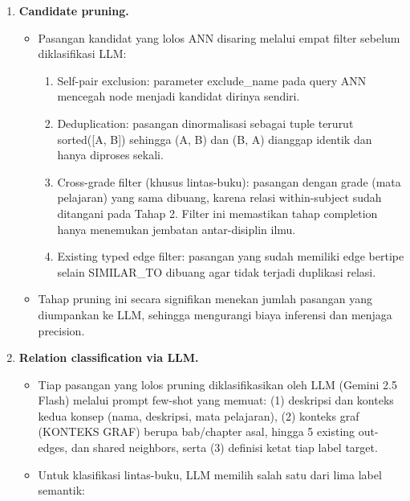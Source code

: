 \documentclass[
]{article}
\begin{document}
\begin{enumerate}
\def\labelenumi{\arabic{enumi}.}
\setcounter{enumi}{2}
\item
  \textbf{Candidate pruning.}

  \begin{itemize}
  \item
    Pasangan kandidat yang lolos ANN disaring melalui empat filter
    sebelum diklasifikasi LLM:

    \begin{enumerate}
    \def\labelenumii{\roman{enumii}.}
    \item
      Self-pair exclusion: parameter exclude\_name pada query ANN
      mencegah node menjadi kandidat dirinya sendiri.
    \item
      Deduplication: pasangan dinormalisasi sebagai tuple terurut
      sorted({[}A, B{]}) sehingga (A, B) dan (B, A) dianggap identik dan
      hanya diproses sekali.
    \item
      Cross-grade filter (khusus lintas-buku): pasangan dengan grade
      (mata pelajaran) yang sama dibuang, karena relasi within-subject
      sudah ditangani pada Tahap 2. Filter ini memastikan tahap
      completion hanya menemukan jembatan antar-disiplin ilmu.
    \item
      Existing typed edge filter: pasangan yang sudah memiliki edge
      bertipe selain SIMILAR\_TO dibuang agar tidak terjadi duplikasi
      relasi.
    \end{enumerate}
  \item
    Tahap pruning ini secara signifikan menekan jumlah pasangan yang
    diumpankan ke LLM, sehingga mengurangi biaya inferensi dan menjaga
    precision.
  \end{itemize}
\item
  \textbf{Relation classification via LLM.}

  \begin{itemize}
  \item
    Tiap pasangan yang lolos pruning diklasifikasikan oleh LLM (Gemini
    2.5 Flash) melalui prompt few-shot yang memuat: (1) deskripsi dan
    konteks kedua konsep (nama, deskripsi, mata pelajaran), (2) konteks
    graf (KONTEKS GRAF) berupa bab/chapter asal, hingga 5 existing
    out-edges, dan shared neighbors, serta (3) definisi ketat tiap label
    target.
  \item
    Untuk klasifikasi lintas-buku, LLM memilih salah satu dari lima
    label semantik:


\end{itemize}
\end{enumerate}
\end{document}
